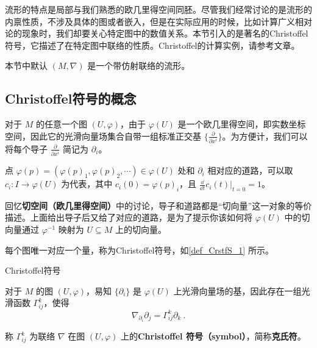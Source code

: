 


流形的特点是局部与我们熟悉的欧几里得空间同胚。尽管我们经常讨论的是流形的内禀性质，不涉及具体的图或者嵌入，但是在实际应用的时候，比如计算广义相对论的现象时，我们却要关心特定图中的数值关系。本节引入的是著名的Christoffel符号，它描述了在特定图中联络的性质。Christoffel的计算实例，请参考文章。

本节中默认 $(M, \nabla)$ 是一个带仿射联络的流形。


\subsection{Christoffel符号的概念}\label{sub_CrstfS_1}

对于 $M$ 的任意一个图 $(U, \varphi)$，由于 $\varphi(U)$ 是一个欧几里得空间，即实数坐标空间，因此它的光滑向量场集合自带一组标准正交基 $\{\frac{\partial}{\partial x^i}\}$。为方便计，我们可以将每个导子 $\frac{\partial}{\partial x^i}$ 简记为 $\partial_i$。

点 $\varphi(p)=(\varphi(p)_1, \varphi(p)_2, \cdots)\in\varphi(U)$ 处和 $\partial_i$ 相对应的道路，可以取 $c_i:I\to \varphi(U)$ 为代表，其中 $c_i(0)=\varphi(p)_i$，且 $\frac{\dd}{\dd t}c_i(t)|_{t=0}=1$。

回忆\textbf{切空间（欧几里得空间）}中的讨论，导子和道路都是“切向量”这一对象的等价描述。上面给出导子后又给了对应的道路，是为了提示你该如何将 $\varphi(U)$ 中的切向量通过 $\varphi^{-1}$ 映射为 $U\subseteq M$ 上的切向量。

每个图唯一对应一个量，称为Christoffel符号，如\autoref{def_CrstfS_1} 所示。

\begin{definition}{Christoffel符号}\label{def_CrstfS_1}

对于 $M$ 的图 $(U, \varphi)$，易知 $\{\partial_i\}$ 是 $\varphi(U)$ 上光滑向量场的基，因此存在一组光滑函数 $\Gamma^k_{ij}$，使得
\begin{equation}
\nabla_{\partial_i}\partial_j=\Gamma^k_{ij}\partial_k~.
\end{equation}

称 $\Gamma^k_{ij}$ 为联络 $\nabla$ 在图 $(U, \varphi)$ 上的\textbf{Christoffel 符号（symbol）}，简称\textbf{克氏符}。
\end{definition}

